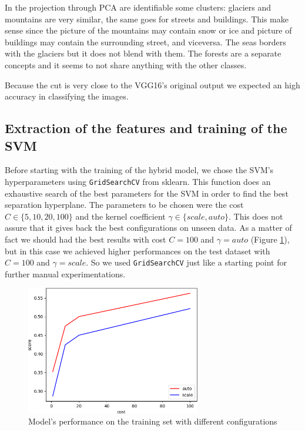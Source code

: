 \documentclass[compsoc]{IEEEtran}
\begin{document}
In the projection through PCA are identifiable some clusters: glaciers and mountains are very similar, the same goes for streets and buildings. This make sense since the picture of the mountains may contain snow or ice and picture of buildings may contain the surrounding street, and viceversa. The seas borders with the glaciers but it does not blend with them. The forests are a separate concepts and it seems to not share anything with the other classes. \par
Because the cut is very close to the VGG16's original output we expected an high accuracy in classifying the images.




\subsection{Extraction of the features and training of the SVM}
Before starting with the training of the hybrid model, we chose the SVM's hyperparameters using \texttt{GridSearchCV} from sklearn. This function does an exhaustive search of the best parameters for the SVM in order to find the best separation hyperplane. The parameters to be chosen were the cost $C \in \{5, 10, 20, 100\}$ and the kernel coefficient $\gamma \in \{scale, auto\}$. This does not assure that it gives back the best configurations on unseen data. As a matter of fact we should had the best results with cost $C=100$ and $\gamma=auto$ (Figure \ref{fig:costs}), but in this case we achieved higher performances on the test dataset with $C=100$ and $\gamma=scale$. So we used \texttt{GridSearchCV} just like a starting point for further manual experimentations.

\begin{figure}[ht!]
\centering                                                                        
\includegraphics[width=3in]{../images/costs.png}
\captionsetup{justification=centering}                                                                                         
\caption{Model's performance on the training set with different configurations}
\label{fig:costs}                                                                                                                               
\end{figure}
\end{document}
